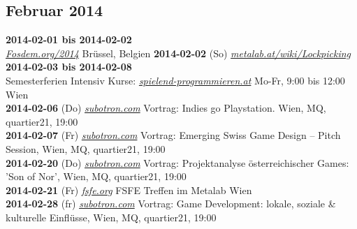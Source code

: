 \subsection*{Februar 2014}
\textbf{2014-02-01 bis 2014-02-02}\\ \href{https://fosdem.org/2014/}{\textit{Fosdem.org/2014}} Brüssel, Belgien
\textbf{2014-02-02} (So) \href{https://metalab.at/wiki/Lockpicking}{\textit{metalab.at/wiki/Lockpicking}}\\
\textbf{2014-02-03 bis 2014-02-08}\\ Semesterferien Intensiv Kurse: \href{http://spielend-programmieren.at}{\textit{spielend-programmieren.at}} Mo-Fr, 9:00 bis 12:00 Wien\\ 
\textbf{2014-02-06} (Do) \href{http://subotron.com/veranstaltung/playstationheartsdevs/}{\textit{subotron.com}} Vortrag: Indies go Playstation. Wien, MQ, quartier21, 19:00\\
\textbf{2014-02-07} (Fr) \href{http://subotron.com/veranstaltung/emerging-swiss-game-design/}{\textit{subotron.com}} Vortrag: Emerging Swiss Game Design – Pitch Session, Wien, MQ, quartier21, 19:00\\
\textbf{2014-02-20} (Do) \href{http://subotron.com/veranstaltung/son-of-nor/}{\textit{subotron.com}} Vortrag: Projektanalyse österreichischer Games: 'Son of Nor', Wien, MQ, quartier21, 19:00\\
\textbf{2014-02-21} (Fr) \href{http://fsfe.org}{\textit{fsfe.org}} FSFE Treffen im Metalab Wien\\
\textbf{2014-02-28} (fr) \href{http://subotron.com/veranstaltung/local-social-cultural/}{\textit{subotron.com}} Vortrag: Game Development: lokale, soziale \& kulturelle Einflüsse, Wien, MQ, quartier21, 19:00\\
